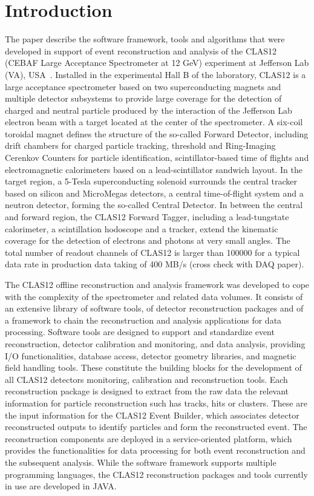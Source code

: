 \section{Introduction}

The paper describe the software framework, tools and algorithms that were developed in support of event reconstruction and analysis of the CLAS12 (CEBAF Large Acceptance Spectrometer at 12 GeV) experiment at Jefferson Lab (VA), USA~\cite{clas12-nim}. Installed in the experimental Hall B of the laboratory, CLAS12 is a large acceptance spectrometer based on two superconducting magnets and multiple detector subsystems to provide large coverage for the detection of charged and neutral particle produced by the interaction of the Jefferson Lab electron beam with a target located at the center of the spectrometer. A six-coil toroidal magnet defines the structure of the so-called Forward Detector, including drift chambers for charged particle tracking, threshold and Ring-Imaging Cerenkov Counters for particle identification, scintillator-based time of flights and electromagnetic calorimeters based on a lead-scintillator sandwich layout. In the target region, a 5-Tesla superconducting solenoid surrounds the central tracker based on silicon and MicroMegas detectors, a central time-of-flight system and a neutron detector, forming the so-called Central Detector. In between the central and forward region, the CLAS12 Forward Tagger, including a lead-tungstate calorimeter, a scintillation hodoscope and a tracker, extend the kinematic coverage for the detection of electrons and photons at very small angles. The total number of readout channels of CLAS12 is larger than 100000 for a typical data rate in production data taking of 400 MB/s (cross check with DAQ paper).  

The CLAS12 offline reconstruction and analysis framework was developed to cope with the complexity of the spectrometer and related data volumes. It consists of an extensive library of software tools, of detector reconstruction packages and of a framework to chain the reconstruction and analysis applications for data processing. Software tools are designed to support and standardize event reconstruction, detector calibration and monitoring, and data analysis, providing I/O functionalities, database access, detector geometry libraries, and magnetic field handling tools. These constitute the building blocks for the development of all CLAS12 detectors monitoring, calibration and reconstruction tools. Each reconstruction package is designed to extract from the raw data the relevant information for particle reconstruction such has tracks, hits or clusters. These are the input information for the CLAS12 Event Builder, which associates detector reconstructed outputs to identify particles and form the reconstructed event. The reconstruction components are deployed in a service-oriented platform, which provides the functionalities for data processing for both event reconstruction and the subsequent analysis.
While the software framework supports multiple programming languages, the CLAS12 reconstruction packages and tools currently in use are developed in JAVA.

